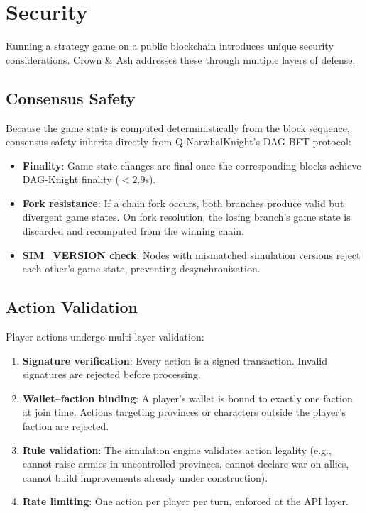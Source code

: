 \documentclass[a4paper, 11pt]{article}
\begin{document}
\section{Security}
\label{sec:security}

Running a strategy game on a public blockchain introduces unique security
considerations. Crown \& Ash addresses these through multiple layers of
defense.

\subsection{Consensus Safety}

Because the game state is computed deterministically from the block sequence,
consensus safety inherits directly from Q-NarwhalKnight's DAG-BFT protocol:

\begin{itemize}
  \item \textbf{Finality}: Game state changes are final once the
    corresponding blocks achieve DAG-Knight finality ($< 2.9$s).
  \item \textbf{Fork resistance}: If a chain fork occurs, both branches
    produce valid but divergent game states. On fork resolution, the
    losing branch's game state is discarded and recomputed from the
    winning chain.
  \item \textbf{SIM\_VERSION check}: Nodes with mismatched simulation
    versions reject each other's game state, preventing desynchronization.
\end{itemize}

\subsection{Action Validation}

Player actions undergo multi-layer validation:

\begin{enumerate}
  \item \textbf{Signature verification}: Every action is a signed
    transaction. Invalid signatures are rejected before processing.
  \item \textbf{Wallet--faction binding}: A player's wallet is bound to
    exactly one faction at join time. Actions targeting provinces or
    characters outside the player's faction are rejected.
  \item \textbf{Rule validation}: The simulation engine validates action
    legality (e.g., cannot raise armies in uncontrolled provinces, cannot
    declare war on allies, cannot build improvements already under
    construction).
  \item \textbf{Rate limiting}: One action per player per turn, enforced
    at the API layer.
\end{enumerate}
\end{document}
